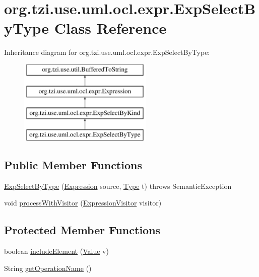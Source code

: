 \hypertarget{classorg_1_1tzi_1_1use_1_1uml_1_1ocl_1_1expr_1_1_exp_select_by_type}{\section{org.\-tzi.\-use.\-uml.\-ocl.\-expr.\-Exp\-Select\-By\-Type Class Reference}
\label{classorg_1_1tzi_1_1use_1_1uml_1_1ocl_1_1expr_1_1_exp_select_by_type}
}
Inheritance diagram for org.\-tzi.\-use.\-uml.\-ocl.\-expr.\-Exp\-Select\-By\-Type\-:\begin{figure}[H]
\begin{center}
\leavevmode
\includegraphics[height=4.000000cm]{classorg_1_1tzi_1_1use_1_1uml_1_1ocl_1_1expr_1_1_exp_select_by_type}
\end{center}
\end{figure}
\subsection*{Public Member Functions}
\begin{DoxyCompactItemize}
\item 
\hyperlink{classorg_1_1tzi_1_1use_1_1uml_1_1ocl_1_1expr_1_1_exp_select_by_type_a4fcf84989ef7977b8616d4be968daca3}{Exp\-Select\-By\-Type} (\hyperlink{classorg_1_1tzi_1_1use_1_1uml_1_1ocl_1_1expr_1_1_expression}{Expression} source, \hyperlink{interfaceorg_1_1tzi_1_1use_1_1uml_1_1ocl_1_1type_1_1_type}{Type} t)  throws Semantic\-Exception 
\item 
void \hyperlink{classorg_1_1tzi_1_1use_1_1uml_1_1ocl_1_1expr_1_1_exp_select_by_type_a8d37b130da91b52089fe9e786fa51e5f}{process\-With\-Visitor} (\hyperlink{interfaceorg_1_1tzi_1_1use_1_1uml_1_1ocl_1_1expr_1_1_expression_visitor}{Expression\-Visitor} visitor)
\end{DoxyCompactItemize}
\subsection*{Protected Member Functions}
\begin{DoxyCompactItemize}
\item 
boolean \hyperlink{classorg_1_1tzi_1_1use_1_1uml_1_1ocl_1_1expr_1_1_exp_select_by_type_a3312c249dd4b82cc4d125496380e8ea8}{include\-Element} (\hyperlink{classorg_1_1tzi_1_1use_1_1uml_1_1ocl_1_1value_1_1_value}{Value} v)
\item 
String \hyperlink{classorg_1_1tzi_1_1use_1_1uml_1_1ocl_1_1expr_1_1_exp_select_by_type_a9f7ad5fb5212c2fe56e8f10899de1952}{get\-Operation\-Name} ()
\end{DoxyCompactItemize}


